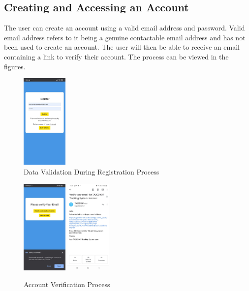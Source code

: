 \documentclass[conference]{IEEEtran}
\begin{document}
\subsection{Creating and Accessing an Account}
The user can create an account using a valid email address and password. Valid email address refers to it being a genuine contactable email address and has not been used to create an account. The user will then be able 
to receive an email containing a link to verify their account. The process can be viewed in the figures. 
\begin{figure}[htbp]
    \centering
    \includegraphics[width=0.2\textwidth]{registerfail1}
    \caption{Data Validation During Registration Process}
    \label{fig1}
\end{figure}
\begin{figure}[htbp]
    \centering
    \includegraphics[width=0.2\textwidth]{emailver1}
    \includegraphics[width=0.2\textwidth]{emailver2}
    \caption{Account Verification Process}
    \label{fig1}
\end{figure}
\end{document}
